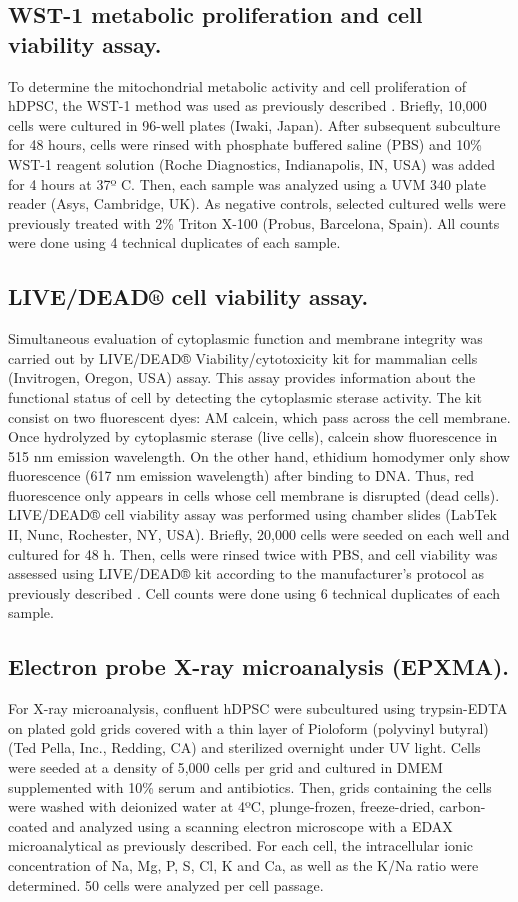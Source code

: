 \documentclass[a4paper,12pt]{article}
\begin{document}
\subsection{WST-1 metabolic proliferation and cell viability assay.}
To determine the mitochondrial metabolic activity and cell proliferation of hDPSC, the WST-1 method was used as previously described \cite{RN770}. Briefly, 10,000 cells were cultured in 96-well plates (Iwaki, Japan). After subsequent subculture for 48 hours, cells were rinsed with phosphate buffered saline (PBS) and 10\% WST-1 reagent solution (Roche Diagnostics, Indianapolis, IN, USA) was added for 4 hours at 37º C. Then, each sample was analyzed using a UVM 340 plate reader (Asys, Cambridge, UK). As negative controls, selected cultured wells were previously treated with 2\% Triton X-100 (Probus, Barcelona, Spain). All counts were done using 4 technical duplicates of each sample.\\
\subsection{LIVE/DEAD® cell viability assay.}
Simultaneous evaluation of cytoplasmic function and membrane integrity was carried out by LIVE/DEAD® Viability/cytotoxicity kit for mammalian cells (Invitrogen, Oregon, USA) assay. This assay provides information about the functional status of cell by detecting the cytoplasmic sterase activity. The kit consist on two fluorescent dyes: AM calcein, which pass across the cell membrane. Once hydrolyzed by cytoplasmic sterase (live cells), calcein show fluorescence in 515 nm emission wavelength. On the other hand, ethidium homodymer only show fluorescence (617 nm emission wavelength) after binding to DNA. Thus, red fluorescence only appears in cells whose cell membrane is disrupted (dead cells). LIVE/DEAD® cell viability assay was performed using chamber slides (LabTek II, Nunc, Rochester, NY, USA). Briefly, 20,000 cells were seeded on each well and cultured for 48 h. Then, cells were rinsed twice with PBS, and cell viability was assessed using LIVE/DEAD® kit according to the manufacturer’s protocol as previously described \cite{RN46}. Cell counts were done using 6 technical duplicates of each sample.\\
\subsection{Electron probe X-ray microanalysis (EPXMA).}
For X-ray microanalysis, confluent hDPSC were subcultured using trypsin-EDTA on plated gold grids covered with a thin layer of Pioloform (polyvinyl butyral) (Ted Pella, Inc., Redding, CA) and sterilized overnight under UV light. Cells were seeded at a density of 5,000 cells per grid and cultured in DMEM supplemented with 10\% serum and antibiotics. Then, grids containing the cells were washed with deionized water at 4ºC, plunge-frozen, freeze-dried, carbon-coated and analyzed using a scanning electron microscope with a EDAX microanalytical as previously described. For each cell, the intracellular ionic concentration of Na, Mg, P, S, Cl, K and Ca, as well as the K/Na ratio were determined. 50 cells were analyzed per cell passage.
\end{document}
